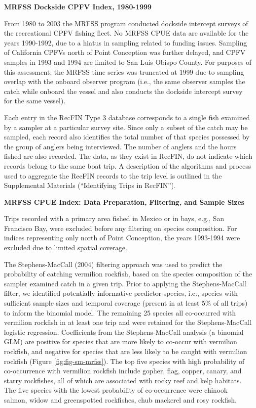 \documentclass[11pt,
  english,
]{article}
\begin{document}
\textbf{MRFSS Dockside CPFV Index, 1980-1999}

From 1980 to 2003 the MRFSS program conducted dockside intercept surveys of the recreational CPFV fishing fleet. No MRFSS CPUE data are available for the years 1990-1992, due to a hiatus in sampling related to funding issues. Sampling of California CPFVs north of Point Conception was further delayed, and CPFV samples in 1993 and 1994 are limited to San Luis Obispo County. For purposes of this assessment, the MRFSS time series was truncated at 1999 due to sampling overlap with the onboard observer program (i.e., the same observer samples the catch while onboard the vessel and also conducts the dockside intercept survey for the same vessel).

Each entry in the RecFIN Type 3 database corresponds to a single fish examined by a sampler at a particular survey site. Since only a subset of the catch may be sampled, each record also identifies the total number of that species possessed by the group of anglers being interviewed. The number of anglers and the hours fished are also recorded. The data, as they exist in RecFIN, do not indicate which records belong to the same boat trip. A description of the algorithms and process used to aggregate the RecFIN records to the trip level is outlined in the Supplemental Materials (``Identifying Trips in RecFIN'').

\textbf{MRFSS CPUE Index: Data Preparation, Filtering, and Sample Sizes}

Trips recorded with a primary area fished in Mexico or in bays, e.g., San Francisco Bay, were excluded before any filtering on species composition. For indices representing only north of Point Conception, the years 1993-1994 were excluded due to limited spatial coverage.

The Stephens-MacCall {(2004)\leavevmode\tagmcend\tagstructend} filtering approach was used to predict the probability of catching vermilion rockfish, based on the species composition of the sampler examined catch in a given trip. Prior to applying the Stephens-MacCall filter, we identified potentially informative predictor species, i.e., species with sufficient sample sizes and temporal coverage (present in at least 5\% of all trips) to inform the binomial model. The remaining 25 species all co-occurred with vermilion rockfish in at least one trip and were retained for the Stephens-MacCall logistic regression. Coefficients from the Stephens-MacCall analysis (a binomial GLM) are positive for species that are more likely to co-occur with vermilion rockfish, and negative for species that are less likely to be caught with vermilion rockfish (Figure \ref{fig:fig-sm-mrfss}). The top five species with high probability of co-occurrence with vermilion rockfish include gopher, flag, copper, canary, and starry rockfishes, all of which are associated with rocky reef and kelp habitats. The five species with the lowest probability of co-occurrence were chinook salmon, widow and greenspotted rockfishes, chub mackerel and rosy rockfish.
\end{document}
